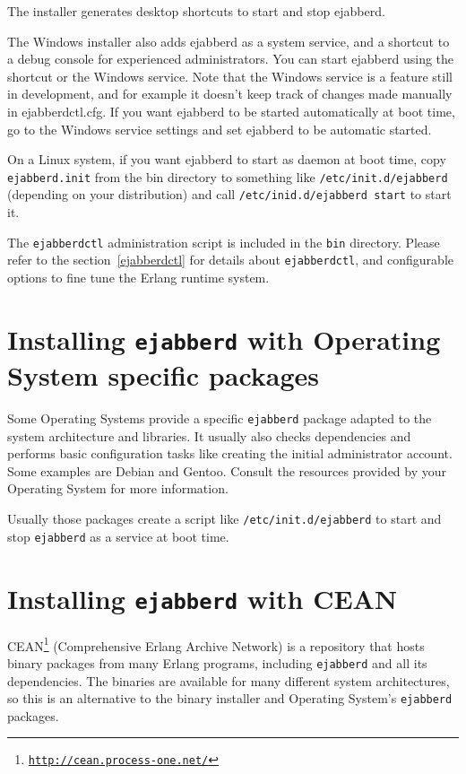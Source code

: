 \documentclass[a4paper,10pt]{book}
\newcommand{\term}[1]{\texttt{#1}}
\newcommand{\ejabberd}{\texttt{ejabberd}}
\gdef\footahref#1#2{#2\footnote{\href{#1}{\texttt{#1}}}}
\begin{document}
The installer generates desktop shortcuts to start and stop ejabberd.

The Windows installer also adds ejabberd as a system service,
and a shortcut to a debug console for experienced administrators.
You can start ejabberd using the shortcut or the Windows service. 
Note that the Windows service is a feature still in development, 
and for example it doesn't keep track of changes made manually in ejabberdctl.cfg.
If you want ejabberd to be started automatically at boot time, 
go to the Windows service settings and set ejabberd to be automatic started.

On a Linux system, if you want ejabberd to start as daemon at boot time, 
copy \term{ejabberd.init} from the bin directory to something like \term{/etc/init.d/ejabberd}
(depending on your distribution) and call \term{/etc/inid.d/ejabberd start} to start it.

The \term{ejabberdctl} administration script is included in the \term{bin} directory.
Please refer to the section~\ref{ejabberdctl} for details about \term{ejabberdctl},
and configurable options to fine tune the Erlang runtime system.

\section{Installing \ejabberd{} with Operating System specific packages}

Some Operating Systems provide a specific \ejabberd{} package adapted to 
the system architecture and libraries.
It usually also checks dependencies 
and performs basic configuration tasks like creating the initial
administrator account. Some examples are Debian and Gentoo. Consult the
resources provided by your Operating System for more information.

Usually those packages create a script like \term{/etc/init.d/ejabberd}
to start and stop \ejabberd{} as a service at boot time.

\section{Installing \ejabberd{} with CEAN}

\footahref{http://cean.process-one.net/}{CEAN}
(Comprehensive Erlang Archive Network) is a repository that hosts binary
packages from many Erlang programs, including \ejabberd{} and all its dependencies.
The binaries are available for many different system architectures, so this is an
alternative to the binary installer and Operating System's \ejabberd{} packages.
\end{document}
